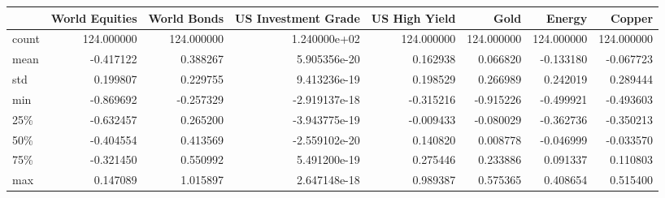 \begin{tabular}{lrrrrrrr}
\toprule
{} &  World Equities &  World Bonds &  US Investment Grade &  US High Yield &        Gold &      Energy &      Copper \\
\midrule
count &      124.000000 &   124.000000 &         1.240000e+02 &     124.000000 &  124.000000 &  124.000000 &  124.000000 \\
mean  &       -0.417122 &     0.388267 &         5.905356e-20 &       0.162938 &    0.066820 &   -0.133180 &   -0.067723 \\
std   &        0.199807 &     0.229755 &         9.413236e-19 &       0.198529 &    0.266989 &    0.242019 &    0.289444 \\
min   &       -0.869692 &    -0.257329 &        -2.919137e-18 &      -0.315216 &   -0.915226 &   -0.499921 &   -0.493603 \\
25\%   &       -0.632457 &     0.265200 &        -3.943775e-19 &      -0.009433 &   -0.080029 &   -0.362736 &   -0.350213 \\
50\%   &       -0.404554 &     0.413569 &        -2.559102e-20 &       0.140820 &    0.008778 &   -0.046999 &   -0.033570 \\
75\%   &       -0.321450 &     0.550992 &         5.491200e-19 &       0.275446 &    0.233886 &    0.091337 &    0.110803 \\
max   &        0.147089 &     1.015897 &         2.647148e-18 &       0.989387 &    0.575365 &    0.408654 &    0.515400 \\
\bottomrule
\end{tabular}
